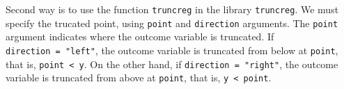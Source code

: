 \documentclass[
  12pt,
]{article}
\newenvironment{Shaded}{\begin{snugshade}}{\end{snugshade}}
\newcommand{\ControlFlowTok}[1]{\textcolor[rgb]{0.13,0.29,0.53}{\textbf{#1}}}
\newcommand{\DataTypeTok}[1]{\textcolor[rgb]{0.13,0.29,0.53}{#1}}
\newcommand{\DecValTok}[1]{\textcolor[rgb]{0.00,0.00,0.81}{#1}}
\newcommand{\KeywordTok}[1]{\textcolor[rgb]{0.13,0.29,0.53}{\textbf{#1}}}
\newcommand{\NormalTok}[1]{#1}
\newcommand{\OperatorTok}[1]{\textcolor[rgb]{0.81,0.36,0.00}{\textbf{#1}}}
\newcommand{\OtherTok}[1]{\textcolor[rgb]{0.56,0.35,0.01}{#1}}
\newcommand{\StringTok}[1]{\textcolor[rgb]{0.31,0.60,0.02}{#1}}
\begin{document}
\begin{Shaded}
\end{Shaded}

Second way is to use the function \texttt{truncreg} in the library \texttt{truncreg}.
We must specify the trucated point, using \texttt{point} and \texttt{direction} arguments.
The \texttt{point} argument indicates where the outcome variable is truncated.
If \texttt{direction\ =\ "left"}, the outcome variable is truncated from below at \texttt{point}, that is, \texttt{point\ \textless{}\ y}.
On the other hand, if \texttt{direction\ =\ "right"}, the outcome variable is truncated from above at \texttt{point}, that is, \texttt{y\ \textless{}\ point}.
\end{document}
